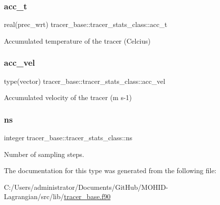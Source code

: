 \subsubsection{\texorpdfstring{acc\+\_\+t}{acc\_t}}
{\footnotesize\ttfamily real(prec\+\_\+wrt) tracer\+\_\+base\+::tracer\+\_\+stats\+\_\+class\+::acc\+\_\+t\hspace{0.3cm}{\ttfamily [private]}}



Accumulated temperature of the tracer (Celcius) 

\mbox{\label{structtracer__base_1_1tracer__stats__class_af5c29fc910469ddabe6e549a3743c310}} 
\subsubsection{\texorpdfstring{acc\+\_\+vel}{acc\_vel}}
{\footnotesize\ttfamily type(vector) tracer\+\_\+base\+::tracer\+\_\+stats\+\_\+class\+::acc\+\_\+vel\hspace{0.3cm}{\ttfamily [private]}}



Accumulated velocity of the tracer (m s-\/1) 

\mbox{\label{structtracer__base_1_1tracer__stats__class_a77e72ef1bc36c7b337f2d1b199010e81}} 
\subsubsection{\texorpdfstring{ns}{ns}}
{\footnotesize\ttfamily integer tracer\+\_\+base\+::tracer\+\_\+stats\+\_\+class\+::ns\hspace{0.3cm}{\ttfamily [private]}}



Number of sampling steps. 



The documentation for this type was generated from the following file\+:\begin{DoxyCompactItemize}
\item 
C\+:/\+Users/administrator/\+Documents/\+Git\+Hub/\+M\+O\+H\+I\+D-\/\+Lagrangian/src/lib/\mbox{\hyperlink{tracer__base_8f90}{tracer\+\_\+base.\+f90}}\end{DoxyCompactItemize}
